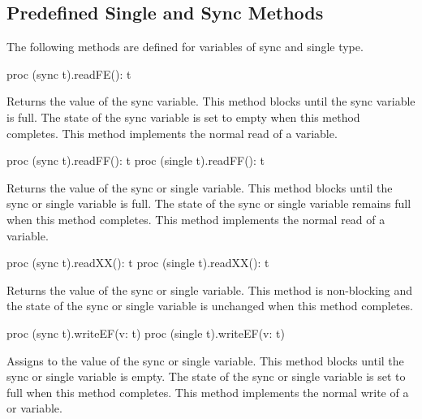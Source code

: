 \subsection{Predefined Single and Sync Methods}
\label{Functions_on_Synchronization_Variables}

The following methods are defined for variables of sync and single
type.

\begin{protohead}
proc (sync t).readFE(): t
\end{protohead}
\begin{protobody}
Returns the value of the sync variable.  This method blocks until the
sync variable is full.  The state of the sync variable is set to empty
when this method completes.
This method implements the normal read of a  variable.
\end{protobody}

\begin{protohead}
proc (sync t).readFF(): t
proc (single t).readFF(): t
\end{protohead}
\begin{protobody}
Returns the value of the sync or single variable.  This method blocks
until the sync or single variable is full.  The state of the sync or
single variable remains full when this method completes.
This method implements the normal read of a  variable.
\end{protobody}

\pagebreak
{}
\begin{protohead}
proc (sync t).readXX(): t
proc (single t).readXX(): t
\end{protohead}
\begin{protobody}
Returns the value of the sync or single variable.  This method is non-blocking
and the state of the sync or single variable is unchanged when this method
completes.
\end{protobody}

\begin{protohead}
proc (sync t).writeEF(v: t)
proc (single t).writeEF(v: t)
\end{protohead}
\begin{protobody}
Assigns  to the value of the sync or single variable.  This
method blocks until the sync or single variable is empty.  The state
of the sync or single variable is set to full when this method
completes.
This method implements the normal write of a  or 
variable.
\end{protobody}

